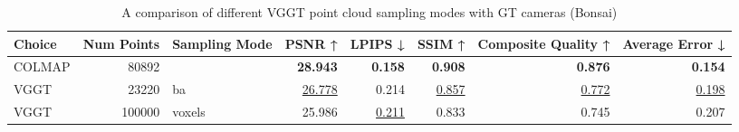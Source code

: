 \begin{table}[H]
\caption{\ifdefined\customcaption \customcaption \else A comparison of different VGGT point cloud sampling modes with GT cameras (Bonsai) \fi}
\label{tab:03_sampling_mode_gt_cams_bonsai}
\centering
\scriptsize
\begin{tabular}{lrlrrrrr}
\toprule
Choice & Num Points & Sampling Mode & PSNR ↑ & LPIPS ↓ & SSIM ↑ & Composite Quality ↑ & Average Error ↓ \\
\midrule
COLMAP & 80892 &  & \textbf{28.943} & \textbf{0.158} & \textbf{0.908} & \textbf{0.876} & \textbf{0.154} \\
VGGT & 23220 & ba & \underline{26.778} & 0.214 & \underline{0.857} & \underline{0.772} & \underline{0.198} \\
VGGT & 100000 & voxels & 25.986 & \underline{0.211} & 0.833 & 0.745 & 0.207 \\
\bottomrule
\end{tabular}
\end{table}
